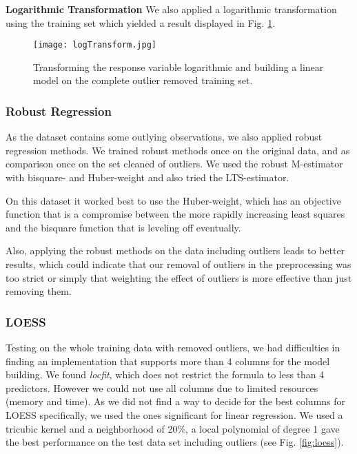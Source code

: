 \documentclass[a4paper]{article}
\begin{document}
\textbf{Logarithmic Transformation} We also applied a logarithmic transformation using the training set which yielded a result displayed in Fig. \ref{fig:logTransform}.
 \begin{figure}[H]
 	\centering
 	\texttt{[image: logTransform.jpg]}
 	\caption{\label{fig:logTransform}Transforming the response variable logarithmic and building a linear model on the complete outlier removed training set.}
 \end{figure}

\subsubsection{Robust Regression}
As the dataset contains some outlying observations, we also applied robust regression methods. We trained robust methods once on the original data, and as comparison once on the set cleaned of outliers. 
We used the robust M-estimator with bisquare- and Huber-weight and also tried the LTS-estimator. 

On this dataset it worked best to use the Huber-weight, which has an objective function that is a compromise between the more rapidly increasing least squares and the bisquare function that is leveling off eventually.

Also, applying the robust methods on the data including outliers leads to better results, which could indicate that our removal of outliers in the preprocessing was too strict or simply that weighting the effect of outliers is more effective than just removing them.

\subsubsection{LOESS}
 Testing on the whole training data with removed outliers, we had difficulties in finding an implementation that supports more than 4 columns for the model building. We found \textit{locfit}, which does not restrict the formula to less than 4 predictors. However we could not use all columns due to limited resources (memory and time). As we did not find a way to decide for the best columns for LOESS specifically, we used the ones significant for linear regression. We used a tricubic kernel and a neighborhood of 20\%, a local polynomial of degree 1 gave the best performance on the test data set including outliers (see Fig. \ref{fig:loess}).
\end{document}
